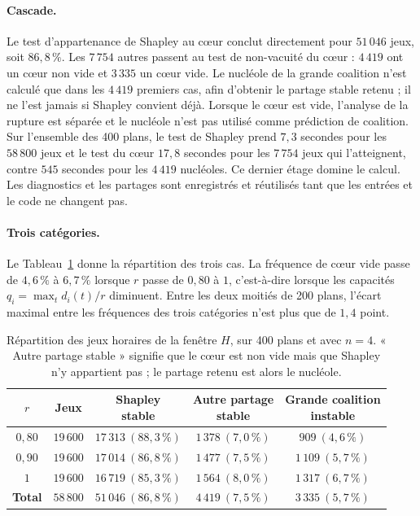 \paragraph{Cascade.}
Le test d'appartenance de Shapley au cœur conclut directement pour \(51\,046\)
jeux, soit \(86{,}8\,\%\). Les
\(7\,754\) autres passent au test de non-vacuité du cœur : \(4\,419\) ont un
cœur non vide et \(3\,335\) un cœur vide. Le nucléole de la grande coalition
n'est calculé que dans les \(4\,419\) premiers cas, afin d'obtenir le partage stable retenu ; il ne
l'est jamais si Shapley convient déjà. Lorsque le cœur est vide, l'analyse de
la rupture est séparée et le nucléole n'est pas utilisé comme prédiction de
coalition. Sur l'ensemble des 400 plans, le test de Shapley prend \(7{,}3\)
secondes pour les \(58\,800\) jeux et le test du cœur \(17{,}8\) secondes pour
les \(7\,754\) jeux qui l'atteignent, contre \(545\) secondes pour les
\(4\,419\) nucléoles. Ce
dernier étage domine le calcul. Les diagnostics et les partages sont
enregistrés et réutilisés tant que les entrées et le code ne changent pas.

\paragraph{Trois catégories.}
Le Tableau~\ref{tab:stabilite_grande_coalition} donne la répartition des trois
cas. La fréquence de cœur vide passe de \(4{,}6\,\%\) à \(6{,}7\,\%\) lorsque
\(r\) passe de \(0{,}80\) à \(1\), c'est-à-dire lorsque les capacités
\(q_i=\max_t d_i(t)/r\) diminuent. Entre les deux moitiés de 200 plans, l'écart maximal
entre les fréquences des trois catégories n'est plus que de \(1{,}4\) point.

\begin{table}[htbp]
\centering
\setlength{\tabcolsep}{4pt}
\begin{tabular}{ccccc}
\hline
\(r\) & Jeux & \shortstack{Shapley\\stable} &
\shortstack{Autre partage\\stable} &
\shortstack{Grande coalition\\instable} \\
\hline
\(0{,}80\) & \(19\,600\) & \(17\,313\ (88{,}3\,\%)\) & \(1\,378\ (7{,}0\,\%)\) & \(909\ (4{,}6\,\%)\) \\
\(0{,}90\) & \(19\,600\) & \(17\,014\ (86{,}8\,\%)\) & \(1\,477\ (7{,}5\,\%)\) & \(1\,109\ (5{,}7\,\%)\) \\
\(1\) & \(19\,600\) & \(16\,719\ (85{,}3\,\%)\) & \(1\,564\ (8{,}0\,\%)\) & \(1\,317\ (6{,}7\,\%)\) \\
\textbf{Total} & \(58\,800\) & \(51\,046\ (86{,}8\,\%)\) & \(4\,419\ (7{,}5\,\%)\) & \(3\,335\ (5{,}7\,\%)\) \\
\hline
\end{tabular}
\caption{Répartition des jeux horaires de la fenêtre \(H\), sur 400 plans
et avec \(n=4\). « Autre partage stable » signifie que le cœur est non vide
mais que Shapley n'y appartient pas ; le partage retenu est alors le
nucléole.}
\label{tab:stabilite_grande_coalition}
\end{table}

